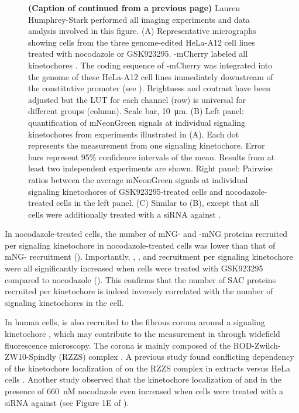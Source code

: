 \begin{figure} [t!]
    \noindent\justifying \textbf{(Caption of  continued from a previous page)} Lauren Humphrey-Stark performed all imaging experiments and data analysis involved in this figure. (A) Representative micrographs showing cells from the three genome-edited HeLa-A12 cell lines treated with nocodazole or GSK923295. -mCherry labeled all kinetochores \cite{Kukreja2020}. The coding sequence of -mCherry was integrated into the genome of these HeLa-A12 cell lines immediately downstream of the constitutive  promoter (see ). Brightness and contrast have been adjusted but the LUT for each channel (row) is universal for different groups (column). Scale bar, \SI{10}{\micro m}. (B) Left panel: quantification of mNeonGreen signals at individual signaling kinetochores from experiments illustrated in (A). Each dot represents the measurement from one signaling kinetochore. Error bars represent 95\% confidence intervals of the mean. Results from at least two independent experiments are shown. Right panel: Pairwise ratios between the average mNeonGreen signals at individual signaling kinetochores of GSK923295-treated cells and nocodazole-treated cells in the left panel. (C) Similar to (B), except that all cells were additionally treated with a siRNA against .
\end{figure}

In nocodazole-treated cells, the number of mNG- and -mNG proteins recruited per signaling kinetochore in nocodazole-treated cells was lower than that of mNG- recruitment (). Importantly, , , and  recruitment per signaling kinetochore were all significantly increased when cells were treated with GSK923295 compared to nocodazole (). This confirms that the number of SAC proteins recruited per kinetochore is indeed inversely correlated with the number of signaling kinetochores in the cell.

In human cells,  is also recruited to the fibrous corona around a signaling kinetochore \cite{RZZ-MAD1vsBUB1-MAD1_2015, RZZ-MAD1vsBUB1-MAD1_2018}, which may contribute to the measurement in  through widefield fluorescence microscopy. The corona is mainly composed of the ROD-Zwilch-ZW10-Spindly (RZZS) complex \cite{RZZS_Sacristan2018}. A previous study found conflicting dependency of the kinetochore localization of  on the RZZS complex in  extracts versus HeLa cells \cite{BUBR1_XenopusVSHeLa}. Another study observed that the kinetochore localization of  and  in the presence of \SI{660}{nM} nocodazole even increased when cells were treated with a siRNA against  (see Figure 1E of \cite{siROD_Zhang2019}).

